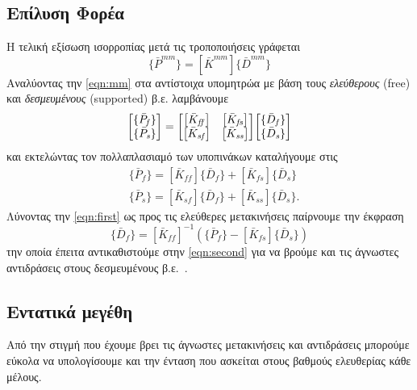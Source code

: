 \documentclass[a4paper, twocolumn]{article}
\newcommand{\vect}[1]{ \{ #1\} }
\newcommand{\mat}[1]{\left[ #1 \right]}
\newcommand{\Gstiff}[1]{\mat{\bar{K}^{\mathit{#1}}}}
\newcommand{\gforce}[1]{\vect{\bar{P}^{\mathit{#1}}}}
\newcommand{\gdisp}[1]{\vect{\bar{D}^{\mathit{#1}}}}
\newcommand{\subk}[1]{ \mat{\bar{K}_{\mathit{#1}}} }
\newcommand{\subp}[1]{\vect{\bar{P}_{\mathit{#1}}}}
\newcommand{\subd}[1]{\vect{\bar{D}_{\mathit{#1}}}}
\begin{document}
\subsection{Επίλυση Φορέα}
Η τελική εξίσωση ισορροπίας μετά τις τροποποιήσεις γράφεται
	\begin{equation}\label{eqn:mm}
		\gforce{mm} = \Gstiff{mm} \gdisp{mm}
	\end{equation}
Αναλύοντας την \ref{eqn:mm} στα αντίστοιχα υπομητρώα με βάση τους 
\emph{ελεύθερους} (free) και \emph{δεσμευμένους} (supported) β.ε. 
λαμβάνουμε
	\begin{equation}
		\mqty[ \subp{f} \\ \subp{s} ] = 
		\mqty[ \subk{ff} & \subk{fs} \\
		\subk{sf}& \subk{ss} ] 
		\mqty[ \subd{f} \\ \subd{s} ]
	\end{equation}
και εκτελώντας τον πολλαπλασιαμό των υποπινάκων καταλήγουμε στις
	\begin{align}
	 	&\subp{f} = \subk{ff} \subd{f} + \subk{fs} \subd{s} 
	 	\label{eqn:first} \\
		&\subp{s} = \subk{sf} \subd{f} + \subk{ss} \subd{s}. 
		\label{eqn:second}
	\end{align}
Λύνοντας την \ref{eqn:first} ως προς τις ελεύθερες 
μετακινήσεις παίρνουμε την έκφραση
	\begin{equation}
		\subd{f} 
		= \subk{ff}^{-1} ( \subp{f} - \subk{fs} \subd{s} ) 
		\label{eqn:dfree} 
	\end{equation}
την οποία έπειτα αντικαθιστούμε στην 
\ref{eqn:second} για να βρούμε και τις άγνωστες αντιδράσεις στους 
δεσμευμένους β.ε.~.

\subsection{Εντατικά μεγέθη}
Από την στιγμή που έχουμε βρει τις άγνωστες μετακινήσεις και 
αντιδράσεις μπορούμε εύκολα να υπολογίσουμε και την ένταση που 
ασκείται στους βαθμούς ελευθερίας κάθε μέλους.
\end{document}
